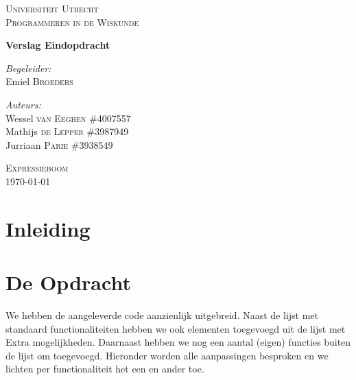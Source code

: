 \documentclass[12pt]{article}
\begin{document}
\begin{titlepage}
\begin{center}

\textsc{\LARGE Universiteit Utrecht}\\[1.6cm]

\textsc{\Large Programmeren in de Wiskunde}\vspace{2pc}

{\huge \bfseries Verslag Eindopdracht}
\vspace{3pc}

\begin{minipage}{0.7\textwidth}
\begin{flushleft} \large
\emph{Begeleider:} \\
Emiel \textsc{Broeders} 
\end{flushleft}
\begin{flushleft} \large
\emph{Auteurs:}\\
Wessel \textsc{van Eeghen} \tab\#4007557\\
Mathijs \textsc{de Lepper}  \tab\#3987949\\
Jurriaan \textsc{Parie}  \tab\tab\#3938549
\end{flushleft}
\end{minipage}
\begin{minipage}{0.4\textwidth}
\end{minipage}
\vspace{10pc} 

\textsc{\Large Expressieboom}\\[4.0cm]
{\large \today}
\end{center}
\end{titlepage}

\newpage

\section{Inleiding}


\section{De Opdracht}
We hebben de aangeleverde code aanzienlijk uitgebreid. Naast de lijst met standaard functionaliteiten hebben we ook elementen toegevoegd uit de lijst met Extra mogelijkheden. Daarnaast hebben we nog een aantal (eigen) functies buiten de lijst om toegevoegd. Hieronder worden alle aanpassingen besproken en we lichten per functionaliteit het een en ander toe.
\end{document}
